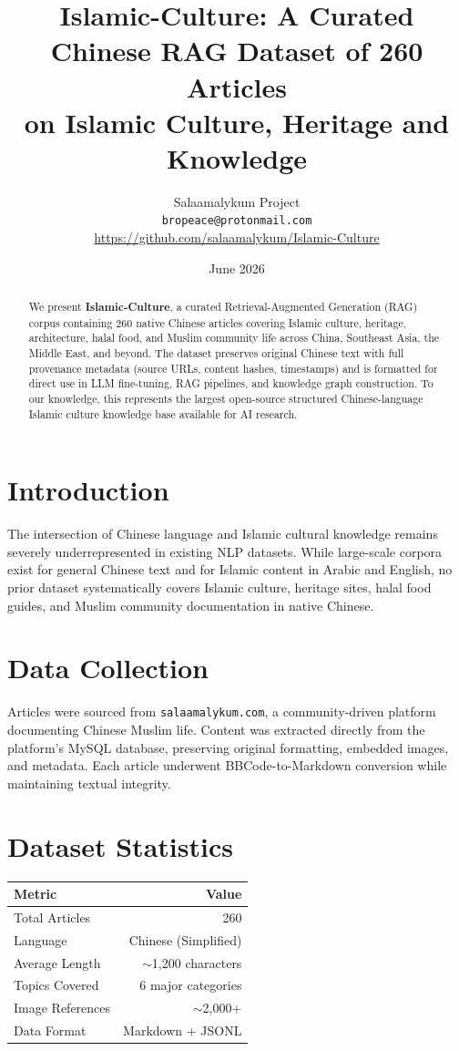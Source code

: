 \documentclass[10pt]{article}
\title{Islamic-Culture: A Curated Chinese RAG Dataset of 260 Articles\\on Islamic Culture, Heritage and Knowledge}
\author{Salaamalykum Project \\ \texttt{bropeace@protonmail.com} \\ \url{https://github.com/salaamalykum/Islamic-Culture}}
\date{June 2026}
\begin{document}
\maketitle

\begin{abstract}
We present \textbf{Islamic-Culture}, a curated Retrieval-Augmented Generation (RAG) corpus containing 260 native Chinese articles covering Islamic culture, heritage, architecture, halal food, and Muslim community life across China, Southeast Asia, the Middle East, and beyond. The dataset preserves original Chinese text with full provenance metadata (source URLs, content hashes, timestamps) and is formatted for direct use in LLM fine-tuning, RAG pipelines, and knowledge graph construction. To our knowledge, this represents the largest open-source structured Chinese-language Islamic culture knowledge base available for AI research.
\end{abstract}

\section{Introduction}
The intersection of Chinese language and Islamic cultural knowledge remains severely underrepresented in existing NLP datasets. While large-scale corpora exist for general Chinese text and for Islamic content in Arabic and English, no prior dataset systematically covers Islamic culture, heritage sites, halal food guides, and Muslim community documentation in native Chinese.

\section{Data Collection}
Articles were sourced from \texttt{salaamalykum.com}, a community-driven platform documenting Chinese Muslim life. Content was extracted directly from the platform's MySQL database, preserving original formatting, embedded images, and metadata. Each article underwent BBCode-to-Markdown conversion while maintaining textual integrity.

\section{Dataset Statistics}
\begin{table}[h]
\centering
\begin{tabular}{lr}
\toprule
\textbf{Metric} & \textbf{Value} \\
\midrule
Total Articles & 260 \\
Language & Chinese (Simplified) \\
Average Length & $\sim$1,200 characters \\
Topics Covered & 6 major categories \\
Image References & $\sim$2,000+ \\
Data Format & Markdown + JSONL \\
\bottomrule
\end{tabular}
\end{table}
\end{document}
